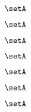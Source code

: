 \begin{forslides}
    \begin{equation}
        \label{eq:systems-183}
        \setA
    \end{equation}

    \begin{equation}
        \label{eq:systems-184}
        \setA
    \end{equation}

    \begin{equation}
        \label{eq:systems-185}
        \setA
    \end{equation}

    \begin{equation}
        \label{eq:systems-186}
        \setA
    \end{equation}

    \begin{equation}
        \label{eq:systems-187}
        \setA
    \end{equation}

    \begin{equation}
        \label{eq:systems-188}
        \setA
    \end{equation}

    \begin{equation}
        \label{eq:systems-189}
        \setA
    \end{equation}

\end{forslides}